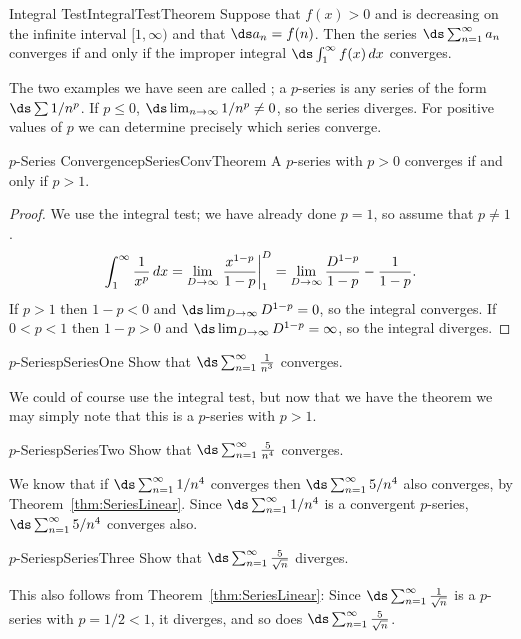 \begin{theorem}{Integral Test}{IntegralTestTheorem}
Suppose that $f(x)>0$ and is decreasing on the infinite interval
$[1,\infty)$ and that $\ds a_n=f(n)$. Then the series
$\ds\sum_{n=1}^\infty a_n$ converges if and only if the improper
integral $\ds\int_{1}^\infty f(x)\,dx$ converges.
\end{theorem}

The two examples we have seen are called
; a $p$-series is
any series of the form $\ds \sum 1/n^p$. If $p\le0$, $\ds\lim_{n\to\infty}
1/n^p\not=0$, so the series diverges. For positive values of $p$ we
can determine precisely which series converge.

\begin{theorem}{$p$-Series Convergence}{pSeriesConvTheorem}
A $p$-series with $p>0$ converges if and only if $p>1$.
\end{theorem}
\begin{proof}
We use the integral test; we have already done $p=1$, so assume that
$p\not=1$.
$$
  \int_1^{\infty} {1\over x^p}\,dx=\lim_{D\to\infty} \left.{x^{1-p}\over
  1-p}\right|_{1}^D=\lim_{D\to\infty} {D^{1-p}\over 1-p}-{1\over 1-p}.
$$
If $p>1$ then $1-p<0$ and $\ds\lim_{D\to\infty}D^{1-p}=0$, so the
  integral converges. If $0<p<1$ then $1-p>0$ and 
$\ds\lim_{D\to\infty}D^{1-p}=\infty$, so the integral diverges.
\end{proof}

\begin{example}{$p$-Series}{pSeriesOne}
Show that $\ds\sum_{n=1}^\infty {1\over {n^3}}$ converges. 
\end{example}
\begin{solution}
We could of course use
the integral test, but now that we have the theorem we may simply note
that this is a $p$-series with $p>1$.
\end{solution}

\begin{example}{$p$-Series}{pSeriesTwo}
Show that $\ds\sum_{n=1}^\infty {5\over n^4}$ converges. 
\end{example}
\begin{solution}
We know that if
$\ds \sum_{n=1}^\infty 1/n^4$ converges then $\ds \sum_{n=1}^\infty 5/n^4$
also converges, by Theorem~\ref{thm:SeriesLinear}. Since 
$\ds \sum_{n=1}^\infty 1/n^4$ is a convergent $p$-series, 
 $\ds \sum_{n=1}^\infty 5/n^4$ converges also.
\end{solution}

\begin{example}{$p$-Series}{pSeriesThree}
Show that $\ds\sum_{n=1}^\infty {5\over \sqrt{n}}$ diverges.
\end{example}
\begin{solution}
This also follows from Theorem~\ref{thm:SeriesLinear}: Since $\ds\sum_{n=1}^\infty
{1\over \sqrt{n}}$ is a $p$-series with $p=1/2<1$, it diverges, and so
does $\ds\sum_{n=1}^\infty {5\over \sqrt{n}}$.  
\end{solution}

